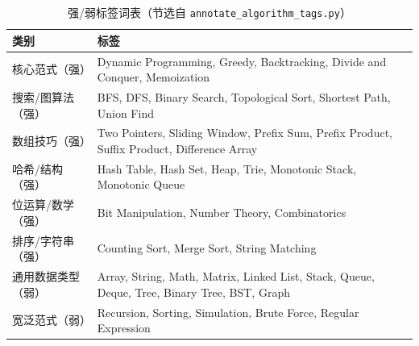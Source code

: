 \begin{table}[!htb]
  \centering
  \caption{强/弱标签词表（节选自 \texttt{annotate\_algorithm\_tags.py}）}
  \label{tab:ch3-tags}
  \footnotesize
  \begin{tabular}{p{} p{}}
    \toprule
    \textbf{类别} & \textbf{标签}\\
    \midrule
    核心范式（强）    & Dynamic Programming, Greedy, Backtracking, Divide and Conquer, Memoization\\
    搜索/图算法（强） & BFS, DFS, Binary Search, Topological Sort, Shortest Path, Union Find\\
    数组技巧（强）    & Two Pointers, Sliding Window, Prefix Sum, Prefix Product, Suffix Product, Difference Array\\
    哈希/结构（强）   & Hash Table, Hash Set, Heap, Trie, Monotonic Stack, Monotonic Queue\\
    位运算/数学（强） & Bit Manipulation, Number Theory, Combinatorics\\
    排序/字符串（强） & Counting Sort, Merge Sort, String Matching\\
    \midrule
    通用数据类型（弱） & Array, String, Math, Matrix, Linked List, Stack, Queue, Deque, Tree, Binary Tree, BST, Graph\\
    宽泛范式（弱）     & Recursion, Sorting, Simulation, Brute Force, Regular Expression\\
    \bottomrule
  \end{tabular}
\end{table}